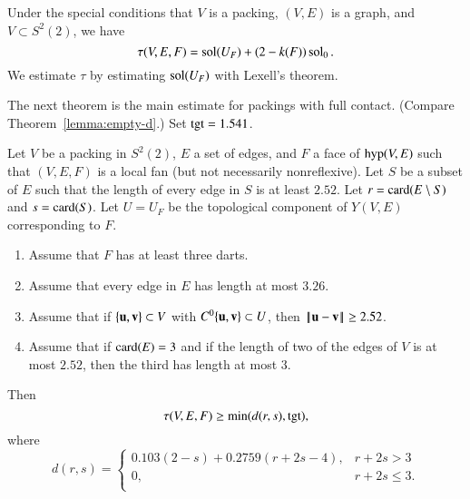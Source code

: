 \documentclass{llncs}
\def\op#1{{\hbox{#1}}}
\begin{document}
Under the 
special conditions that 
$V$ is a packing, $(V,E)$ is a  graph, and
$V\subset S^2(2)$, we have 
\[
\tau(V,E,F) = \operatorname{sol}(U_F) + (2-k(F)) \operatorname{sol}_0.
\]
We estimate $\tau$ by estimating $\operatorname{sol}(U_F)$ with Lexell's theorem.



The next theorem is the main estimate for packings with full contact.
(Compare  Theorem~\ref{lemma:empty-d}.)  
Set $\op{tgt}=1.541$.
%
\indy{Notation}{tgt@$\op{tgt}=1.541$}%


\begin{theorem}\label{lemma:main-estimate-12}
  Let $V$ be a packing in $S^2(2)$, $E$ a set of edges, and $F$ a face
  of $\op{hyp}(V,E)$ such that $(V,E,F)$ is a local fan (but not
  necessarily nonreflexive).  Let
  $S$ be a subset of $E$ such that the length of every edge in $S$ is
  at least $2.52$.   Let $r=\card(E\setminus S)$ and $s = \card(S)$.
 Let $U=U_F$ be the topological component of
  $Y(V,E)$ corresponding to $F$. 
\begin{enumerate}
\item  Assume that $F$ has at least three
  darts. 
\item Assume that every edge in $E$ has length at most $3.26$.     
\item Assume that if $\{{\mathbf u},{\mathbf v}\}\subset V$
  with $C^0\{{\mathbf u},{\mathbf v}\}\subset U$, then %
  $\norm{\u}{\v}\ge 2.52$.
\item Assume that if $\card(E)=3$ and if 
the length of two of the edges of $V$ is at most $2.52$, then the third has
length at most $3$.
 \end{enumerate}
Then
\begin{equation}\label{eqn:tau-tgt}
\tau(V,E,F) \ge \min(d(r,s),\op{tgt}),
\end{equation}
where 
\[ d(r,s) = 
\begin{cases}
0.103 (2-s) + 0.2759 (r+2s-4), & r + 2s > 3\\
0, & r + 2s \le 3.\\
\end{cases}
\] 
\end{theorem}
%
\end{document}
